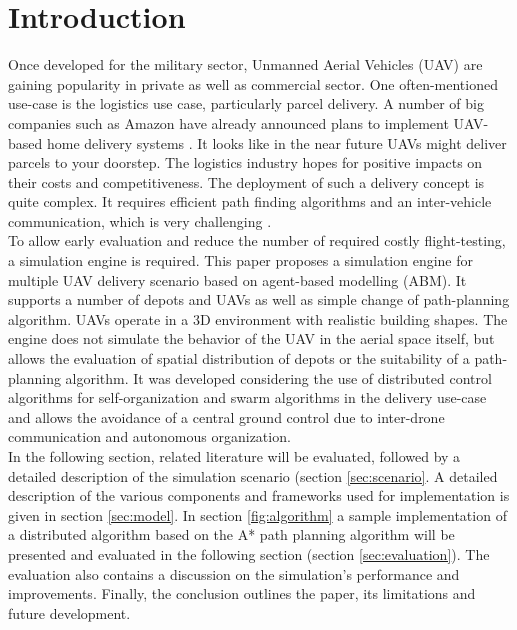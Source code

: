 \section{Introduction}
Once developed for the military sector, Unmanned Aerial Vehicles (UAV) are gaining popularity in private as well as commercial sector. One often-mentioned use-case is the logistics use case, particularly parcel delivery. A number of big companies such as Amazon have already announced plans to implement UAV-based home delivery systems \cite{stolaroff.2014}. It looks like in the near future UAVs might deliver parcels to your doorstep. The logistics industry hopes for positive impacts on their costs and competitiveness. The deployment of such a delivery concept is quite complex. It requires efficient path finding algorithms and an inter-vehicle communication, which is very challenging \cite{bekmezci.2013}.\\
To allow early evaluation and reduce the number of required costly flight-testing, a simulation engine is required. This paper proposes a simulation engine for multiple UAV delivery scenario based on agent-based modelling (ABM). It supports a number of depots and UAVs as well as simple change of path-planning algorithm. UAVs operate in a 3D environment with realistic building shapes. The engine does not simulate the behavior of the UAV in the aerial space itself, but allows the evaluation of spatial distribution of depots or the suitability of a path-planning algorithm. It was developed considering the use of distributed control algorithms for self-organization and swarm algorithms in the delivery use-case and allows the avoidance of a central ground control due to inter-drone communication and autonomous organization.\\
In the following section, related literature will be evaluated, followed by a detailed description of the simulation scenario (section \ref{sec:scenario}. A detailed description of the various components and frameworks used for implementation is given in section \ref{sec:model}. In section \ref{fig:algorithm} a sample implementation of a distributed algorithm based on the A* path planning algorithm \cite{hart.1968} will be presented and evaluated in the following section (section \ref{sec:evaluation}). The evaluation also contains a discussion on the simulation's performance and improvements. Finally, the conclusion outlines the paper, its limitations and future development.

